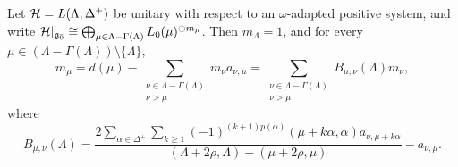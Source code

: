 \begin{theorem}\label{thm::branching_recursion}
Let ${\mathcal{H}}=L(\Lambda;\Delta^+)$ be unitary with respect to an $\omega$-adapted positive system, and write ${\mathcal{H}}\vert_{{\mathfrak{g}_{\bar{0}}}}\cong\bigoplus_{\mu\in\Lambda-\Gamma(\Lambda)}L_0(\mu)^{\oplus m_\mu}$. Then $m_\Lambda=1$, and for every $\mu\in(\Lambda-\Gamma(\Lambda))\setminus\{\Lambda\}$,
\begin{equation*}
m_\mu
=
d(\mu)-\sum_{\substack{\nu\in\Lambda-\Gamma(\Lambda)\\ \nu>\mu}}m_\nu a_{\nu,\mu}
=
\sum_{\substack{\nu\in\Lambda-\Gamma(\Lambda)\\ \nu>\mu}}
B_{\mu,\nu}(\Lambda)m_\nu,
\end{equation*}
where
\begin{equation*}
B_{\mu,\nu}(\Lambda)
=
\frac{2\displaystyle\sum_{\alpha\in\Delta^+}\sum_{k\geq1}
(-1)^{(k+1)p(\alpha)}
(\mu+k\alpha,\alpha)a_{\nu,\mu+k\alpha}}
{(\Lambda+2\rho,\Lambda)-(\mu+2\rho,\mu)}
-a_{\nu,\mu}.
\end{equation*}
\end{theorem}

